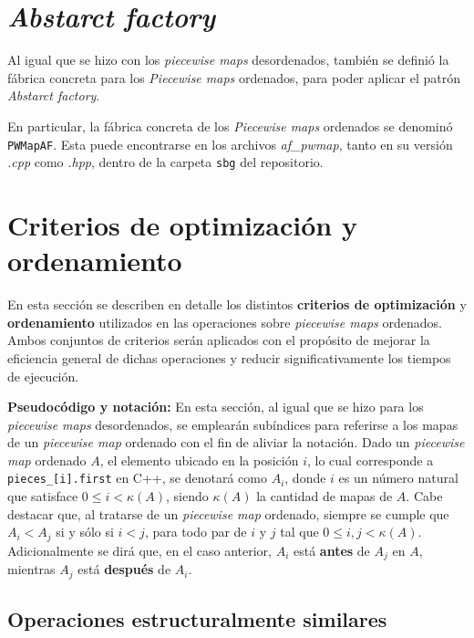 \section{\textit{Abstarct factory}}

Al igual que se hizo con los \textit{piecewise maps} desordenados,
también se definió la fábrica concreta para los \textit{Piecewise maps} ordenados, para poder aplicar el patrón \textit{Abstarct factory}. 

En particular, la fábrica concreta de los \textit{Piecewise maps} ordenados se denominó 
\texttt{PWMapAF}. Esta puede encontrarse en los archivos 
\textit{af\_pwmap}, tanto en su versión 
\textit{.cpp} como \textit{.hpp}, dentro de la carpeta \texttt{sbg} del repositorio.

\section{Criterios de optimización y ordenamiento}\label{sec:pwmap-opts}

En esta sección se describen en detalle los distintos \textbf{criterios de optimización} y \textbf{ordenamiento} utilizados en las operaciones sobre \textit{piecewise maps} ordenados. Ambos conjuntos de criterios serán aplicados con el propósito de mejorar la eficiencia general de dichas operaciones y reducir significativamente los tiempos de ejecución.

\textbf{Pseudocódigo y notación:} En esta sección, al igual que se hizo para los \textit{piecewise maps} desordenados, se emplearán subíndices para referirse a los mapas de un \textit{piecewise map} ordenado con el fin de aliviar la notación. Dado un \textit{piecewise map} ordenado $A$, el elemento ubicado en la posición $i$, lo cual corresponde a \texttt{pieces\_[i].first} en C++, se denotará como \textbf{$A_i$}, donde $i$ es un número natural que satisface $0 \leq i < \kappa(A)$, siendo $\kappa(A)$ la cantidad de mapas de $A$. Cabe destacar que, al tratarse de un \textit{piecewise map} ordenado, siempre se cumple que $A_i < A_j$ si y sólo si $i < j$, para todo par de $i$ y $j$ tal que $0  \leq i, j < \kappa(A)$. Adicionalmente se dirá que, en el caso anterior, $A_i$ está \textbf{antes} de $A_j$ en $A$, mientras $A_j$ está \textbf{después} de $A_i$.

\subsection{Operaciones estructuralmente similares}

